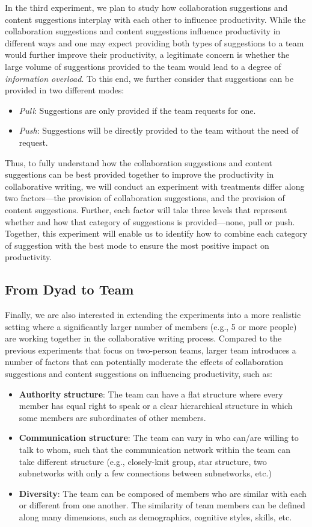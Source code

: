 In the third experiment, we plan to study how collaboration suggestions and content suggestions interplay with each other to influence productivity. While the collaboration suggestions and content suggestions influence productivity in different ways and one may expect providing both types of suggestions to a team would further improve their productivity, a legitimate concern is whether the large volume of suggestions provided to the team would lead to a degree of {\em information overload}. To this end, we further consider that suggestions can be provided in two different modes:
\begin{itemize}[leftmargin=*]
\item {\em Pull}: Suggestions are only provided if the team requests for one.
\item {\em Push}: Suggestions will be directly provided to the team without the need of request.
\end{itemize}
Thus, to fully understand how the collaboration suggestions and content suggestions can be best provided together to improve the productivity in collaborative writing, we will conduct an experiment with treatments differ along two factors---the provision of collaboration suggestions, and the provision of content suggestions. Further, each factor will take three levels that represent whether and how that category of suggestions is provided---none, pull or push. Together, this experiment will enable us to identify how to combine each category of suggestion with the best mode to ensure the most positive impact on productivity. 

 


\subsection{From Dyad to Team}
\label{sec:exp4}
Finally, we are also interested in extending the experiments into a more realistic setting where a significantly larger number of members (e.g., 5 or more people) are working together in the collaborative writing process. Compared to the previous experiments that focus on two-person teams, larger team introduces a number of factors that can potentially moderate the effects of collaboration suggestions and content suggestions on influencing productivity, such as:
\begin{itemize}
\item{\bf Authority structure}: The team can have a flat structure where every member has equal right to speak or a clear hierarchical structure in which some members are subordinates of other members.
\item{\bf Communication structure}: The team can vary in who can/are willing to talk to whom, such that the communication network within the team can take different structure (e.g., closely-knit group, star structure, two subnetworks with only a few connections between subnetworks, etc.) 
\item{\bf Diversity}: The team can be composed of members who are similar with each or different from one another. The similarity of team members can be defined along many dimensions, such as demographics, cognitive styles, skills, etc.
\end{itemize}


